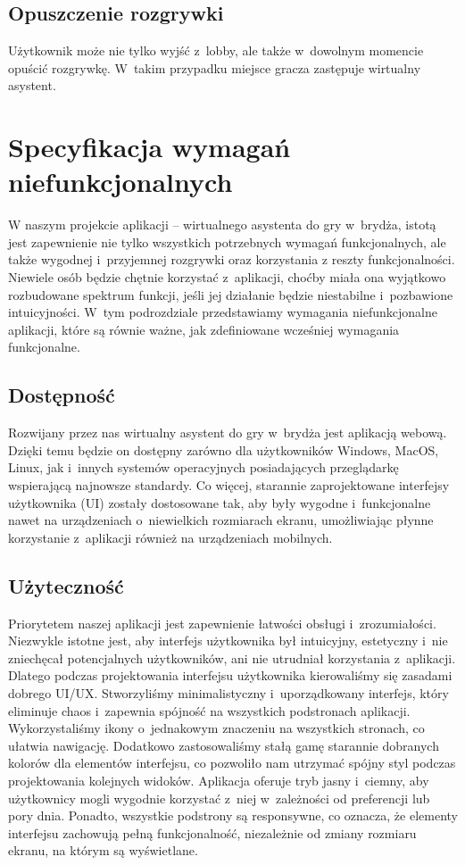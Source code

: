 \subsection{Opuszczenie rozgrywki}
Użytkownik może nie tylko wyjść z~lobby, ale także w~dowolnym momencie
opuścić rozgrywkę. W~takim przypadku miejsce gracza zastępuje
wirtualny asystent.




\section{Specyfikacja wymagań niefunkcjonalnych}
W naszym projekcie aplikacji -- wirtualnego asystenta do gry w~brydża,
istotą jest zapewnienie nie tylko wszystkich potrzebnych wymagań
funkcjonalnych, ale także wygodnej i~przyjemnej rozgrywki oraz
korzystania z reszty funkcjonalności. Niewiele osób będzie chętnie
korzystać z~aplikacji, choćby miała ona wyjątkowo rozbudowane spektrum
funkcji, jeśli jej działanie będzie niestabilne i~pozbawione
intuicyjności. W~tym podrozdziale przedstawiamy wymagania
niefunkcjonalne aplikacji, które są równie ważne, jak zdefiniowane
wcześniej wymagania funkcjonalne.
\subsection{Dostępność}
Rozwijany przez nas wirtualny asystent do gry w~brydża jest aplikacją
webową. Dzięki temu będzie on dostępny zarówno dla użytkowników
Windows, MacOS, Linux, jak i~innych systemów operacyjnych posiadających
przeglądarkę wspierającą najnowsze standardy. Co więcej, starannie
zaprojektowane interfejsy użytkownika (UI) zostały dostosowane tak,
aby były wygodne i~funkcjonalne nawet na urządzeniach o~niewielkich
rozmiarach ekranu, umożliwiając płynne korzystanie z~aplikacji również
na urządzeniach mobilnych.
\subsection{Użyteczność}
Priorytetem naszej aplikacji jest zapewnienie łatwości obsługi
i~zrozumiałości. Niezwykle istotne jest, aby interfejs użytkownika
był intuicyjny, estetyczny i~nie zniechęcał potencjalnych użytkowników,
ani nie utrudniał korzystania z~aplikacji. Dlatego podczas projektowania
interfejsu użytkownika kierowaliśmy się zasadami dobrego UI/UX.
Stworzyliśmy minimalistyczny i~uporządkowany interfejs, który eliminuje
chaos i~zapewnia spójność na wszystkich podstronach aplikacji.
Wykorzystaliśmy ikony o~jednakowym znaczeniu na wszystkich stronach,
co ułatwia nawigację. Dodatkowo zastosowaliśmy stałą gamę starannie
dobranych kolorów dla elementów interfejsu, co pozwoliło nam utrzymać
spójny styl podczas projektowania kolejnych widoków. Aplikacja oferuje
tryb jasny i~ciemny, aby użytkownicy mogli wygodnie korzystać z~niej
w~zależności od preferencji lub pory dnia. Ponadto, wszystkie podstrony
są responsywne, co oznacza, że elementy interfejsu zachowują pełną
funkcjonalność, niezależnie od zmiany rozmiaru ekranu, na którym są
wyświetlane.
